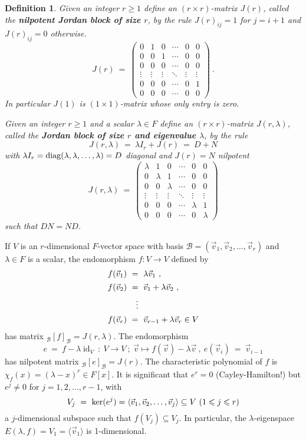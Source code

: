 \documentclass[11pt]{amsbook}
\DeclareMathOperator{\id}{\mathrm{id}}
\newtheorem{definition}[theorem]{Definition}
\theoremstyle{definition}
\begin{document}
\begin{definition} \label{JNblock} Given an integer $r\geqslant 1$ define an $(r\times r)$-matrix $J(r)$, called the {\bf nilpotent Jordan block of size $r$}, by the rule $J(r)_{ij} = 1 $ for $j = i+1$ and $J(r)_{ij} = 0$ otherwise.
 $$ J(r)  ~=~  \begin{pmatrix} 
0 & 1 & 0 &  \cdots & 0 &  0 \\ 
 0 & 0 & 1 & \cdots & 0 & 0\\ 
 0 & 0 & 0 & \cdots & 0 & 0\\
 \vdots & \vdots & \vdots & \ddots & \vdots &\vdots  \\
  0 & 0 & 0& \cdots & 0 & 1 \\ 0 & 0 & 0 & \cdots & 0 &0
   \end{pmatrix}~.$$
 In particular $J(1)$ is $(1\times 1)$-matrix whose only entry is zero.

 Given an integer $r\geqslant 1$ and a scalar $\lambda \in F$ define an $(r\times r)$-matrix $J(r, \lambda)$, called the {\bf Jordan block of size $r$ and eigenvalue $\lambda$}, by the rule 
 $$J(r, \lambda) ~=~ \lambda I_r+ J(r)~=~D+N$$
 with $\lambda I_r={\rm diag}(\lambda,\lambda,\dots,\lambda)=D$ diagonal and $J(r)=N$  nilpotent
 $$ J(r, \lambda )  ~=~  \begin{pmatrix} 
 \lambda & 1 & 0 &  \cdots & 0 &  0 \\ 
 0 & \lambda & 1 & \cdots & 0 & 0\\ 
 0 & 0 & \lambda & \cdots & 0 & 0\\
 \vdots & \vdots & \vdots & \ddots & \vdots &\vdots  \\
  0 & 0 & 0& \cdots & \lambda & 1 \\ 0 & 0 & 0 & \cdots & 0 & \lambda \end{pmatrix}$$
such that $DN=ND$.
\end{definition}

If $V$ is an $r$-dimensional $F$-vector space with basis $\mathcal{B}=(\vec{v}_1,\vec{v}_2,\dots,\vec{v}_r)$ and $\lambda \in F$
is a scalar, the endomorphism  $f:V \to V$ defined by
$$\begin{array}{l}
f(\vec{v}_1)~=~\lambda\vec{v}_1~,\\[1ex]
f(\vec{v}_2)~=~\vec{v}_1+\lambda \vec{v}_2~,\\[1ex]
\hskip12mm \vdots \\[1ex]
f(\vec{v}_r)~=~\vec{v}_{r-1}+\lambda \vec{v}_r \in V
\end{array}$$
has matrix $_{\mathcal B}[f]_{\mathcal B}=J(r,\lambda)$. The endomorphism
$$e~=~f-\lambda \id_V~:~V \to V~;~\vec{v} \mapsto f(\vec{v}) - \lambda\vec{v}~,~e(\vec{v}_i)~=~\vec{v}_{i-1}$$
has nilpotent matrix $_{\mathcal B}[e]_{\mathcal B}=J(r)$.
The characteristic polynomial of $f$ is $\chi_f(x)=(\lambda-x)^r \in F[x]$. It is significant that $e^r=0$ (Cayley-Hamilton!) but $e^j \neq 0$ for $j=1,2,\dots,r-1$, with 
$$V_j~=~{\rm ker}(e^j)=\langle \vec{v}_1,\vec{v}_2,\dots,\vec{v}_j\rangle \subseteq V~(1 \leqslant j \leqslant r)$$ 
a $j$-dimensional subspace such that $f(V_j) \subseteq V_j$. In particular,  the $\lambda$-eigenspace $E(\lambda,f)=V_1=\langle \vec{v}_1 \rangle$ is 1-dimensional. 
\medskip
\end{document}
